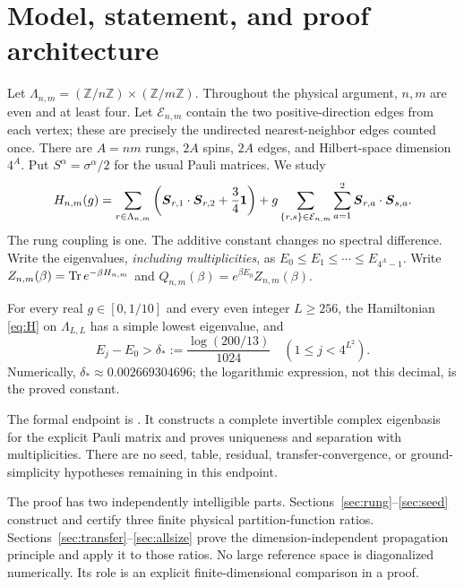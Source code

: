 \section{Model, statement, and proof architecture}\label{sec:model}
Let $\Lambda_{n,m}=(\mathbb Z/n\mathbb Z)\times(\mathbb Z/m\mathbb Z)$.
Throughout the physical argument, $n,m$ are even and at least four. Let
$\mathcal E_{n,m}$ contain the two positive-direction edges from each vertex;
these are precisely the undirected nearest-neighbor edges counted once.
There are $A=nm$ rungs, $2A$ spins, $2A$ edges, and Hilbert-space dimension
$4^A$. Put $S^\alpha=\sigma^\alpha/2$ for the usual Pauli matrices. We study
\begin{equation}\label{eq:H}
 H_{n,m}(g)=\sum_{r\in\Lambda_{n,m}}
 \left(\boldsymbol S_{r,1}\cdot\boldsymbol S_{r,2}+\frac34\mathbf 1\right)
 +g\sum_{\{r,s\}\in\mathcal E_{n,m}}\sum_{a=1}^2
       \boldsymbol S_{r,a}\cdot\boldsymbol S_{s,a}.
\end{equation}
The rung coupling is one. The additive constant changes no spectral difference.
Write the eigenvalues, \emph{including multiplicities}, as
$E_0\le E_1\le\cdots\le E_{4^A-1}$. Write $Z_{n,m}(\beta)=\operatorname{Tr} e^{-\beta H_{n,m}}$
and $Q_{n,m}(\beta)=e^{\beta E_0}Z_{n,m}(\beta)$.

\begin{theorem}\label{thm:main}
For every real $g\in[0,1/10]$ and every even integer $L\ge256$, the Hamiltonian
\eqref{eq:H} on $\Lambda_{L,L}$ has a simple lowest eigenvalue, and
\begin{equation}\label{eq:main}
 E_j-E_0>\delta_*:=\frac{\log(200/13)}{1024}
 \quad(1\le j<4^{L^2}).
\end{equation}
Numerically, $\delta_*\approx0.002669304696$; the logarithmic expression, not
this decimal, is the proved constant.
\end{theorem}

The formal endpoint is
.
It constructs a complete invertible complex eigenbasis for the explicit Pauli
matrix and proves uniqueness and separation with multiplicities. There are no
seed, table, residual, transfer-convergence, or ground-simplicity hypotheses
remaining in this endpoint.

The proof has two independently intelligible parts. Sections~\ref{sec:rung}--\ref{sec:seed}
construct and certify three finite physical partition-function ratios. Sections~\ref{sec:transfer}--\ref{sec:allsize}
prove the dimension-independent propagation principle and apply it to those
ratios. No large reference space is diagonalized numerically. Its role is an
explicit finite-dimensional comparison in a proof.

